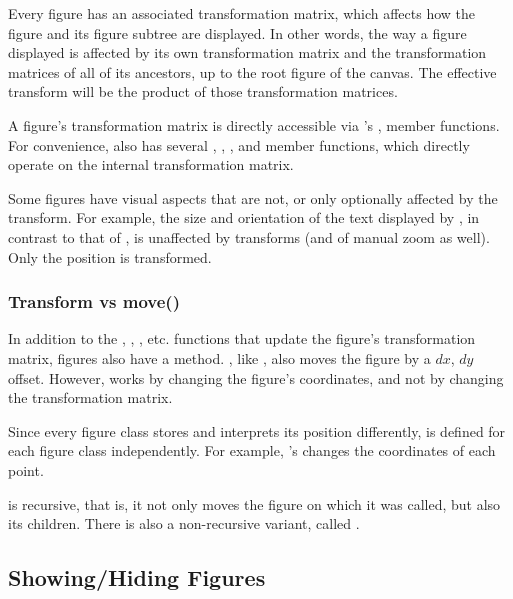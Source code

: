 Every figure has an associated transformation matrix, which
affects how the figure and its figure subtree are displayed.
In other words, the way a figure displayed is affected by its own
transformation matrix and the transformation matrices of all of its
ancestors, up to the root figure of the canvas. The effective transform
will be the product of those transformation matrices.

A figure's transformation matrix is directly accessible via 's
,  member functions.
For convenience,  also has several , ,
,  and  member functions,
which directly operate on the internal transformation matrix.

Some figures have visual aspects that are not, or only optionally affected
by the transform. For example, the size and orientation of the text
displayed by , in contrast to that of
, is unaffected by transforms (and of manual zoom as
well). Only the position is transformed.

\subsubsection{Transform vs move()}
\label{sec:graphics:figure-transform-vs-move}

In addition to the , , ,
etc. functions that update the figure's transformation matrix, figures also
have a  method. , like ,
also moves the figure by a $dx$, $dy$ offset. However,  works
by changing the figure's coordinates, and not by changing the
transformation matrix.

Since every figure class stores and interprets its position differently,
 is defined for each figure class independently. For example,
's  changes the coordinates of each point.

 is recursive, that is, it not only moves the figure on which
it was called, but also its children. There is also a non-recursive variant,
called .


\subsection{Showing/Hiding Figures}
\label{sec:graphics:showing-hiding-figures}

